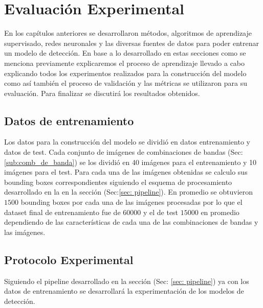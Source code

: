 \chapter{Evaluación Experimental}\label{chap:evaluacion}

En los capítulos anteriores se desarrollaron métodos, algoritmos de aprendizaje supervisado, redes neuronales y las diversas fuentes de datos para poder entrenar un modelo de detección. En  base a lo desarrollado en estas secciones  como se menciona previamente explicaremos el proceso de aprendizaje llevado a cabo explicando todos los  experimentos realizados para la construcción del modelo como así también  el proceso de validación y las métricas se utilizaron para su evaluación. Para finalizar se discutirá los resultados obtenidos. 



\section{Datos de entrenamiento}\label{sec:datos_entrenamiento}

Los datos para la construcción del modelo se dividió en  datos entrenamiento y datos de test. Cada conjunto de imágenes de combinaciones de bandas (Sec:\ref{sub:comb_de_banda}) se los dividió en 40 imágenes para el entrenamiento y 10 imágenes para el test. Para cada una de las imágenes obtenidas se calculo sus bounding boxes correspondientes  siguiendo el esquema de procesamiento desarrollado en la  en la sección (Sec:\ref{sec: pipeline}). En promedio se obtuvieron $1500$ bounding boxes por cada una de las imágenes procesadas por lo que el dataset final de entrenamiento fue de $60000$ y el de test $15000$ en promedio dependiendo de las características de cada una de las combinaciones de bandas y las imágenes. 



\section{Protocolo Experimental}\label{sec:entrenamiento}

Siguiendo el pipeline desarrollado en la sección (Sec: \ref{sec: pipeline}) ya con los datos de entrenamiento se desarrollará la experimentación de los modelos de detección.

